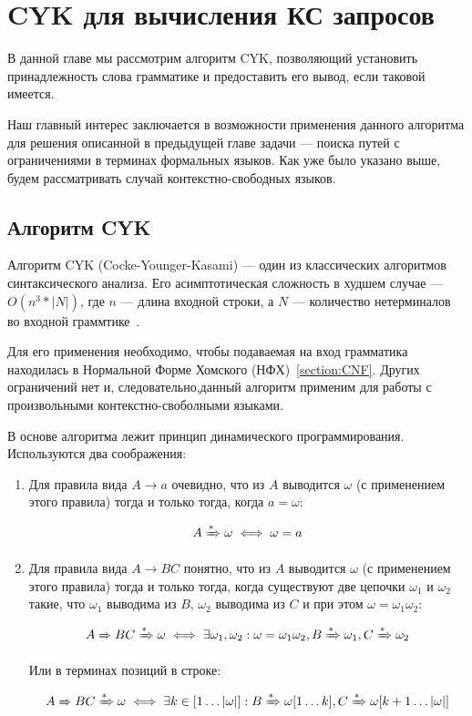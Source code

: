 \chapter{CYK для вычисления КС запросов}\label{chpt:CFPQ_CYK}

В данной главе мы рассмотрим алгоритм CYK, позволяющий установить принадлежность слова грамматике и предоставить его вывод, если таковой имеется.

Наш главный интерес заключается в возможности применения данного алгоритма для решения описанной в предыдущей главе задачи --- поиска путей с ограничениями в терминах формальных языков. Как уже было указано выше, будем рассматривать случай контекстно-свободных языков.

\section{Алгоритм CYK}\label{sect:lin_CYK}

Алгоритм CYK (Cocke-Younger-Kasami) --- один из классических алгоритмов синтаксического анализа. Его асимптотическая сложность в худшем случае --- $O(n^3 * |N|)$, где $n$ --- длина входной строки, а $N$ --- количество нетерминалов во входной граммтике~\cite{Hopcroft+Ullman/79/Introduction}.

Для его применения необходимо, чтобы подаваемая на вход грамматика находилась в Нормальной Форме Хомского (НФХ)~\ref{section:CNF}. Других ограничений нет и, следовательно,данный алгоритм применим для работы с произвольными контекстно-своболными языками.

В основе алгоритма лежит принцип динамического программирования. Используются два соображения:

\begin{enumerate}
\item Для правила вида $A \to a$ очевидно, что из $A$ выводится $\omega$ (с применением этого правила) тогда и только тогда, когда $a = \omega$:

\[
  A \xRightarrow[]{*} \omega \iff \omega = a
\]

\item Для правила вида $A \to B C$ понятно, что из $A$ выводится $\omega$ (с применением этого правила) тогда и только тогда, когда существуют две цепочки $\omega_1$ и $\omega_2$ такие, что $\omega_1$ выводима из $B$, $\omega_2$ выводима из $C$ и при этом $\omega = \omega_1 \omega_2$:

\[
A \xRightarrow[]{} B C \xRightarrow[]{*} \omega \iff \exists \omega_1, \omega_2 : \omega = \omega_1 \omega_2, B \xRightarrow[]{*} \omega_1, C \xRightarrow[]{*} \omega_2
\]

Или в терминах позиций в строке:

\[
A \xRightarrow[]{} B C \xRightarrow[]{*} \omega \iff \exists k \in [1 \dots |\omega|] : B \xRightarrow[]{*} \omega[1 \dots k], C \xRightarrow[]{*} \omega[k+1 \dots |\omega|]
\]
\end{enumerate}

